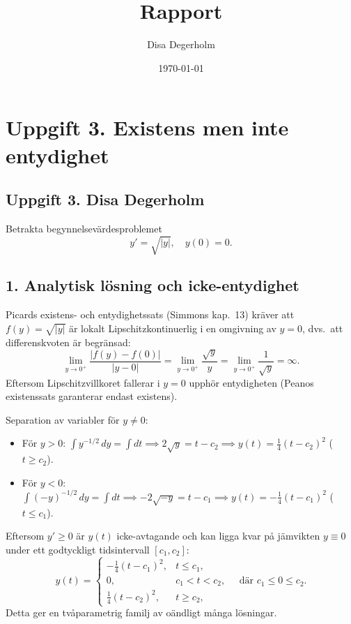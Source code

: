 \documentclass{article}
\title{Rapport}
\author{Disa Degerholm}
\date{\today}
\begin{document}
\maketitle
\thispagestyle{empty}

\section*{Uppgift 3. Existens men inte entydighet}

\subsection*{Uppgift 3. Disa Degerholm}

Betrakta begynnelsevärdesproblemet
\begin{equation}
    y' = \sqrt{|y|}, \quad y(0) = 0.
\end{equation}

\subsection*{1. Analytisk lösning och icke-entydighet}
Picards existens- och entydighetssats (Simmons kap.~13) kräver att $f(y) = \sqrt{|y|}$ är lokalt Lipschitzkontinuerlig i en omgivning av $y = 0$, dvs.~att differenskvoten är begränsad:
\begin{equation}
    \lim_{y \to 0^+} \frac{|f(y) - f(0)|}{|y - 0|} = \lim_{y \to 0^+} \frac{\sqrt{y}}{y} = \lim_{y \to 0^+} \frac{1}{\sqrt{y}} = \infty.
\end{equation}
Eftersom Lipschitzvillkoret fallerar i $y = 0$ upphör entydigheten (Peanos existenssats garanterar endast existens).

Separation av variabler för $y \ne 0$:
\begin{itemize}
    \item För $y > 0$: $\int y^{-1/2}\,dy = \int dt \implies 2\sqrt{y} = t - c_2 \implies y(t) = \frac{1}{4}(t - c_2)^2$ ($t \ge c_2$).
    \item För $y < 0$: $\int (-y)^{-1/2}\,dy = \int dt \implies -2\sqrt{-y} = t - c_1 \implies y(t) = -\frac{1}{4}(t - c_1)^2$ ($t \le c_1$).
\end{itemize}
Eftersom $y' \ge 0$ är $y(t)$ icke-avtagande och kan ligga kvar på jämvikten $y \equiv 0$ under ett godtyckligt tidsintervall $[c_1, c_2]$:
\begin{equation}
    y(t) = \begin{cases}
        -\frac{1}{4}(t - c_1)^2, & t \le c_1, \\
        0, & c_1 < t < c_2, \\
        \frac{1}{4}(t - c_2)^2, & t \ge c_2,
    \end{cases}
    \quad \text{där } c_1 \le 0 \le c_2.
\end{equation}
Detta ger en tvåparametrig familj av oändligt många lösningar.
\end{document}
